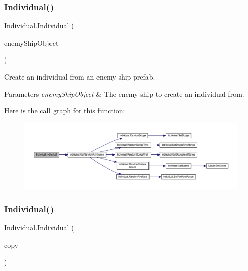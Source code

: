 \subsubsection{\texorpdfstring{Individual()}{Individual()}\hspace{0.1cm}{\footnotesize\ttfamily [1/2]}}
{\footnotesize\ttfamily Individual.\+Individual (\begin{DoxyParamCaption}\item[{Game\+Object}]{enemy\+Ship\+Object }\end{DoxyParamCaption})}



Create an individual from an enemy ship prefab. 


\begin{DoxyParams}{Parameters}
{\em enemy\+Ship\+Object} & The enemy ship to create an individual from.\\
\hline
\end{DoxyParams}
Here is the call graph for this function\+:\nopagebreak
\begin{figure}[H]
\begin{center}
\leavevmode
\includegraphics[width=350pt]{class_individual_ae542e9759275736feb0c5f065d36bfd8_cgraph}
\end{center}
\end{figure}
\mbox{\label{class_individual_a9ae7902f014f58e296bdd87083635756}} 
\subsubsection{\texorpdfstring{Individual()}{Individual()}\hspace{0.1cm}{\footnotesize\ttfamily [2/2]}}
{\footnotesize\ttfamily Individual.\+Individual (\begin{DoxyParamCaption}\item[{\mbox{\hyperlink{class_individual}{Individual}}}]{copy }\end{DoxyParamCaption})}



